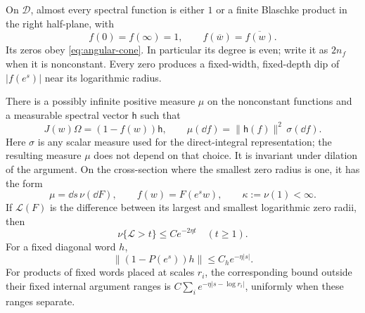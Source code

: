 \begin{lemma}\label{lem:inner-spectra}
On $\mathcal D$, almost every spectral function is either $1$ or a
finite Blaschke product in the right half-plane, with
\begin{equation}\label{eq:finite-inner-symmetry}
 f(0)=f(\infty)=1,\qquad
 f(\overline w)=\overline{f(w)}.
\end{equation}
Its zeros obey \eqref{eq:angular-cone}.  In particular its degree is
even; write it as $2n_f$ when it is nonconstant.  Every zero produces
a fixed-width, fixed-depth dip of $|f(e^s)|$ near its logarithmic radius.

There is a possibly infinite positive measure $\mu$ on the nonconstant
functions and a measurable spectral vector $\mathsf h$ such that
\begin{equation}\label{eq:current-cocycle}
 J(w)\Omega=(1-f(w))\mathsf h,
 \qquad \mu(\dd f)=\|\mathsf h(f)\|^2\,\sigma(\dd f).
\end{equation}
Here $\sigma$ is any scalar measure used for the direct-integral
representation; the resulting measure $\mu$ does not depend on that
choice.  It is invariant under dilation of the argument.  On the
cross-section where the smallest zero radius is one, it has the form
\begin{equation}\label{eq:orbit-disintegration}
 \mu=\dd s\,\nu(\dd F),\qquad f(w)=F(e^s w),\qquad
 \kappa:=\nu(1)<\infty.
\end{equation}
If $\mathcal L(F)$ is the difference between its largest and smallest
logarithmic zero radii, then
\begin{equation}\label{eq:orbit-width-tail}
 \nu\{\mathcal L>t\}\le Ce^{-2\eta t}\quad(t\ge1).
\end{equation}
For a fixed diagonal word $h$,
\begin{equation}\label{eq:diagonal-boost-tail}
 \|(1-P(e^s))h\|\le C_h e^{-\eta|s|}.
\end{equation}
For products of fixed words placed at scales $r_i$, the corresponding
bound outside their fixed internal argument ranges is
$C\sum_i e^{-\eta|s-\log r_i|}$, uniformly when these ranges separate.
\end{lemma}

